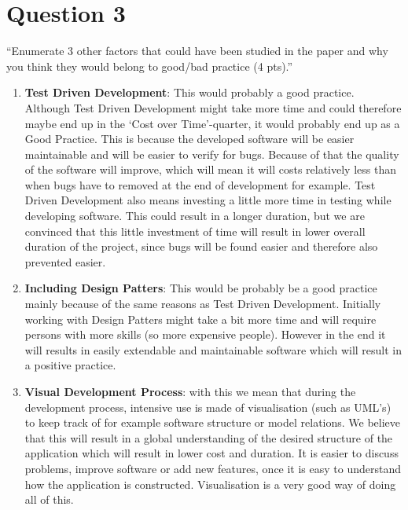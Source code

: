\section{Question 3}

``Enumerate 3 other factors that could have been studied in the paper and why you think they would belong to good/bad practice (4 pts).'' \\

\begin{enumerate}
	\item \textbf{Test Driven Development}: This would probably a good practice. Although Test Driven Development might take more time and could therefore maybe end up in the `Cost over Time'-quarter, it would probably end up as a Good Practice. This is because the developed software will be easier maintainable and will be easier to verify for bugs. Because of that the quality of the software will improve, which will mean it will costs relatively less than when bugs have to removed at the end of development for example. Test Driven Development also means investing a little more time in testing while developing software. This could result in a longer duration, but we are convinced that this little investment of time will result in lower overall duration of the project, since bugs will be found easier and therefore also prevented easier. 
	\item \textbf{Including Design Patters}: This would be probably be a good practice mainly because of the same reasons as Test Driven Development. Initially working with Design Patters might take a bit more time and will require persons with more skills (so more expensive people). However in the end it will results in easily extendable and maintainable software which will result in a positive practice. 
	\item \textbf{Visual Development Process}: with this we mean that during the development process, intensive use is made of visualisation (such as UML's) to keep track of for example software structure or model relations. We believe that this will result in a global understanding of the desired structure of the application which will result in lower cost and duration. It is easier to discuss problems, improve software or add new features, once it is easy to understand how the application is constructed. Visualisation is a very good way of doing all of this. 
\end{enumerate}